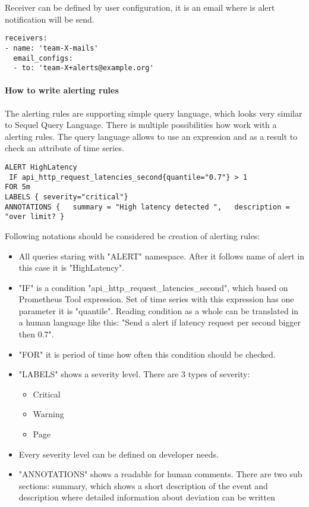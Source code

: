Receiver can be defined by user configuration, it is an email where is alert notification will be send.

 \begin{lstlisting}
receivers:
- name: 'team-X-mails'
  email_configs:
  - to: 'team-X+alerts@example.org'
\end{lstlisting}

\paragraph{How to write alerting rules} 

The alerting rules are supporting simple query language, which looks very similar to Sequel Query Language.  
There is multiple possibilities how work with a alerting rules. The query language allows to use an expression and as a result to check an attribute of time series. 

 \begin{lstlisting}
ALERT HighLatency
 IF api_http_request_latencies_second{quantile="0.7"} > 1 
FOR 5m 
LABELS { severity="critical"} 
ANNOTATIONS {   summary = "High latency detected ",   description = "over limit? } 
\end{lstlisting}

Following notations should be considered be creation of alerting rules:
\begin{itemize}
\item All queries staring with "ALERT" namespace. After it follows name of alert in this case it is "HighLatency".  
\item "IF" is a condition "api\_http\_request\_latencies\_second", which based on Prometheus Tool expression.  Set of time series with this expression has one parameter it is "quantile". Reading condition as a whole can be translated in a human language like this: "Send a alert if latency request per second bigger then 0.7". 
\item "FOR" it is period of time how often this condition should be checked. 
\item "LABELS" shows a severity level. There are 3 types of severity:
\begin{itemize} 
        \item Critical
        \item Warning
        \item Page
     \end{itemize}
\item Every severity level can be defined on developer needs.
\item "ANNOTATIONS" shows a readable for human comments. There are two sub sections: summary, which shows a short description of the event and description where detailed information about deviation can be written
\end{itemize}

